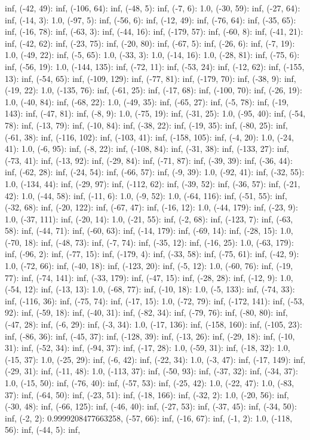 \documentclass[parskip=half]{scrartcl}
\begin{document}
inf, (-42, 49): inf, (-106, 64): inf, (-48, 5): inf, (-7, 6): 1.0, (-30, 59): inf, (-27, 64): inf, (-14, 3): 1.0, (-97, 5): inf, (-56, 6): inf, (-12, 49): inf, (-76, 64): inf, (-35, 65): inf, (-16, 78): inf, (-63, 3): inf, (-44, 16): inf, (-179, 57): inf, (-60, 8): inf, (-41, 21): inf, (-42, 62): inf, (-23, 75): inf, (-20, 80): inf, (-67, 5): inf, (-26, 6): inf, (-7, 19): 1.0, (-49, 22): inf, (-5, 65): 1.0, (-33, 3): 1.0, (-14, 16): 1.0, (-28, 81): inf, (-75, 6): inf, (-56, 19): 1.0, (-144, 135): inf, (-72, 11): inf, (-53, 24): inf, (-12, 62): inf, (-155, 13): inf, (-54, 65): inf, (-109, 129): inf, (-77, 81): inf, (-179, 70): inf, (-38, 9): inf, (-19, 22): 1.0, (-135, 76): inf, (-61, 25): inf, (-17, 68): inf, (-100, 70): inf, (-26, 19): 1.0, (-40, 84): inf, (-68, 22): 1.0, (-49, 35): inf, (-65, 27): inf, (-5, 78): inf, (-19, 143): inf, (-47, 81): inf, (-8, 9): 1.0, (-75, 19): inf, (-31, 25): 1.0, (-95, 40): inf, (-54, 78): inf, (-13, 79): inf, (-10, 84): inf, (-38, 22): inf, (-19, 35): inf, (-80, 25): inf, (-61, 38): inf, (-116, 102): inf, (-103, 41): inf, (-158, 105): inf, (-4, 20): 1.0, (-24, 41): 1.0, (-6, 95): inf, (-8, 22): inf, (-108, 84): inf, (-31, 38): inf, (-133, 27): inf, (-73, 41): inf, (-13, 92): inf, (-29, 84): inf, (-71, 87): inf, (-39, 39): inf, (-36, 44): inf, (-62, 28): inf, (-24, 54): inf, (-66, 57): inf, (-9, 39): 1.0, (-92, 41): inf, (-32, 55): 1.0, (-134, 44): inf, (-29, 97): inf, (-112, 62): inf, (-39, 52): inf, (-36, 57): inf, (-21, 42): 1.0, (-44, 58): inf, (-11, 6): 1.0, (-9, 52): 1.0, (-64, 116): inf, (-51, 55): inf, (-32, 68): inf, (-20, 122): inf, (-67, 47): inf, (-16, 12): 1.0, (-44, 179): inf, (-23, 9): 1.0, (-37, 111): inf, (-20, 14): 1.0, (-21, 55): inf, (-2, 68): inf, (-123, 7): inf, (-63, 58): inf, (-44, 71): inf, (-60, 63): inf, (-14, 179): inf, (-69, 14): inf, (-28, 15): 1.0, (-70, 18): inf, (-48, 73): inf, (-7, 74): inf, (-35, 12): inf, (-16, 25): 1.0, (-63, 179): inf, (-96, 2): inf, (-77, 15): inf, (-179, 4): inf, (-33, 58): inf, (-75, 61): inf, (-42, 9): 1.0, (-72, 66): inf, (-40, 18): inf, (-123, 20): inf, (-5, 12): 1.0, (-60, 76): inf, (-19, 77): inf, (-74, 141): inf, (-33, 179): inf, (-47, 15): inf, (-28, 28): inf, (-12, 9): 1.0, (-54, 12): inf, (-13, 13): 1.0, (-68, 77): inf, (-10, 18): 1.0, (-5, 133): inf, (-74, 33): inf, (-116, 36): inf, (-75, 74): inf, (-17, 15): 1.0, (-72, 79): inf, (-172, 141): inf, (-53, 92): inf, (-59, 18): inf, (-40, 31): inf, (-82, 34): inf, (-79, 76): inf, (-80, 80): inf, (-47, 28): inf, (-6, 29): inf, (-3, 34): 1.0, (-17, 136): inf, (-158, 160): inf, (-105, 23): inf, (-86, 36): inf, (-45, 37): inf, (-128, 39): inf, (-13, 26): inf, (-29, 18): inf, (-10, 31): inf, (-52, 34): inf, (-94, 37): inf, (-17, 28): 1.0, (-59, 31): inf, (-18, 32): 1.0, (-15, 37): 1.0, (-25, 29): inf, (-6, 42): inf, (-22, 34): 1.0, (-3, 47): inf, (-17, 149): inf, (-29, 31): inf, (-11, 48): 1.0, (-113, 37): inf, (-50, 93): inf, (-37, 32): inf, (-34, 37): 1.0, (-15, 50): inf, (-76, 40): inf, (-57, 53): inf, (-25, 42): 1.0, (-22, 47): 1.0, (-83, 37): inf, (-64, 50): inf, (-23, 51): inf, (-18, 166): inf, (-32, 2): 1.0, (-20, 56): inf, (-30, 48): inf, (-66, 125): inf, (-46, 40): inf, (-27, 53): inf, (-37, 45): inf, (-34, 50): inf, (-2, 2): 0.9999208477663258, (-57, 66): inf, (-16, 67): inf, (-1, 2): 1.0, (-118, 56): inf, (-44, 5): inf, 
\end{document}
